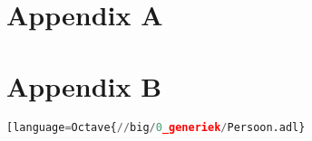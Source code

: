 \newpage
\appendix
\section{Appendix A}





\newpage


\printindex 

\newpage
\section{Appendix B}


\begin{lstlisting}[language=Python]
[language=Octave{//big/0_generiek/Persoon.adl}
\end{lstlisting}
